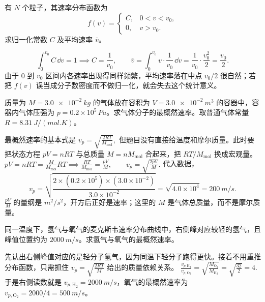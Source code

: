\begin{exercise}[分段常数分布函数怎样先归一化再求平均速率]
有 \(N\) 个粒子，其速率分布函数为
\[
f(v)=
\begin{cases}
C,&0<v<v_0,\\
0,&v>v_0.
\end{cases}
\]
求归一化常数 \(C\) 及平均速率 \(\bar v\)。
\end{exercise}
\begin{solution}
\[
\int_0^{v_0}C\,\dd v=1\implies C=\frac1{v_0},\qquad
\bar v=\int_0^{v_0} v\cdot \frac{1}{v_0}\,\dd v
=\frac{1}{v_0}\cdot \frac{v_0^2}{2}
=\frac{v_0}{2}.
\]
由于 \(0\) 到 \(v_0\) 区间内各速率出现得同样频繁，平均速率落在中点 \(v_0/2\) 很自然；若把 \(f(v)\) 误当成分子数密度而不做归一化，就会失去这个统计意义。
\end{solution}


\begin{exercise}
质量为 \(M=\SI{3.0e-2}{kg}\) 的气体放在容积为 \(V=\SI{3.0e-2}{m^3}\) 的容器中，容器内气体压强为 \(p=0.2\times10^5\,\si{Pa}\)。求气体分子的最概然速率。取普通气体常量 \(R=\SI{8.31}{J/(mol.K)}\)。
\end{exercise}

\begin{solution}
最概然速率的基本式是
 \(v_p=\sqrt{\frac{2RT}{M_{\mathrm{mol}}}},\) 
但题目没有直接给温度和摩尔质量。此时要把状态方程 \(pV=nRT\) 与总质量 \(M=nM_{\mathrm{mol}}\) 合起来，把 \(RT/M_{\mathrm{mol}}\) 换成宏观量。
 \(pV=nRT=\frac{M}{M_{\mathrm{mol}}}RT \implies \frac{RT}{M_{\mathrm{mol}}}=\frac{pV}{M},\qquad v_p=\sqrt{\frac{2pV}{M}}.\) 
代入数据，
\[
v_p=\sqrt{\frac{2\times(0.2\times10^5)\times(3.0\times10^{-2})}{3.0\times10^{-2}}}
=\sqrt{4.0\times10^4}
=\SI{200}{m/s}.
\]
\(\frac{pV}{M}\) 的量纲是 \(\si{m^2/s^2}\)，开方后正好是速率；这里的 \(M\) 是气体总质量，而不是摩尔质量。
\end{solution}

\begin{exercise}[从同温氢气和氧气的分布图怎样反推最概然速率]
同一温度下，氢气与氧气的麦克斯韦速率分布曲线中，右侧峰对应较轻的氢气，且峰值位置约为 \(\SI{2000}{m/s}\)。求氢气与氧气的最概然速率。
\end{exercise}

\begin{solution}
先认出右侧峰值对应的是轻分子氢气，因为同温下轻分子跑得更快。接着不用重推分布函数，只需抓住
 \(v_p=\sqrt{\frac{2RT}{M}}\) 
给出的质量依赖关系。
 \(\frac{v_{p,\mathrm{H_2}}}{v_{p,\mathrm{O_2}}} =\sqrt{\frac{M_{\mathrm{O_2}}}{M_{\mathrm{H_2}}}} =\sqrt{\frac{32}{2}}=4.\) 
于是右侧读数就是 \(v_{p,\mathrm{H_2}}=\SI{2000}{m/s}\)，氧气的最概然速率为 \(v_{p,\mathrm{O_2}}=2000/4=\SI{500}{m/s}\)。
\end{solution}
